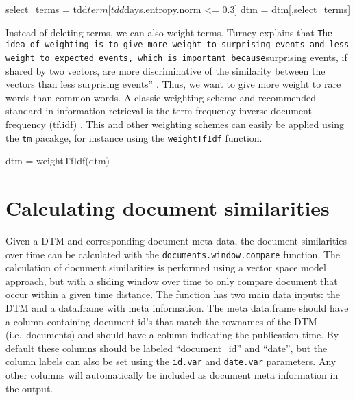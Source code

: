 \begin{Schunk}
\begin{Sinput}
select_terms = tdd$term[tdd$days.entropy.norm <= 0.3]
dtm = dtm[,select_terms]
\end{Sinput}
\end{Schunk}

Instead of deleting terms, we can also weight terms. Turney explains
that
\texttt{The idea of weighting is to give more weight to surprising events and less weight to expected events\textquotesingle{}\textquotesingle{}, which is important because}surprising
events, if shared by two vectors, are more discriminative of the
similarity between the vectors than less surprising events''
\citep[156]{turney02}. Thus, we want to give more weight to rare words
than common words. A classic weighting scheme and recommended standard
in information retrieval is the term-frequency inverse document
frequency (tf.idf) \citep[\citet{monroe08}]{sparck72}. This and other
weighting schemes can easily be applied using the \texttt{tm} pacakge,
for instance using the \texttt{weightTfIdf} function.

\begin{Schunk}
\begin{Sinput}
dtm = weightTfIdf(dtm)
\end{Sinput}
\end{Schunk}

\section{Calculating document
similarities}\label{calculating-document-similarities}

Given a DTM and corresponding document meta data, the document
similarities over time can be calculated with the
\texttt{documents.window.compare} function. The calculation of document
similarities is performed using a vector space model
\citep{salton75, salton03} approach, but with a sliding window over time
to only compare document that occur within a given time distance. The
function has two main data inputs: the DTM and a data.frame with meta
information. The meta data.frame should have a column containing
document id's that match the rownames of the DTM (i.e.~documents) and
should have a column indicating the publication time. By default these
columns should be labeled ``document\_id'' and ``date'', but the column
labels can also be set using the \texttt{id.var} and \texttt{date.var}
parameters. Any other columns will automatically be included as document
meta information in the output.

